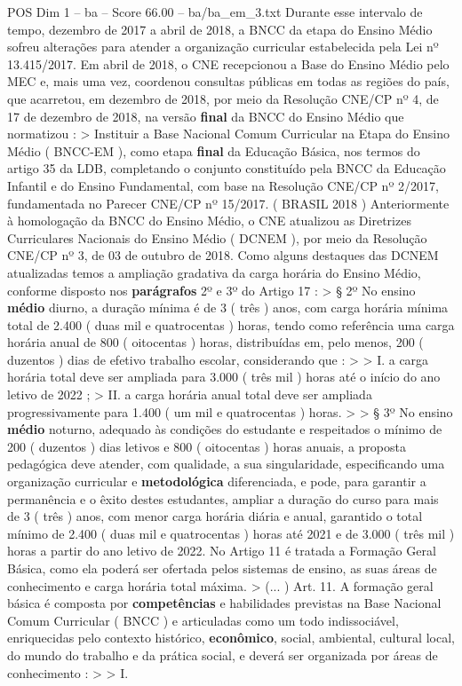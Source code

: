 \begin{textsample}{POS Dim 1 – ba – Score 66.00 – ba/ba\_em\_3.txt}
Durante esse intervalo de tempo, dezembro de 2017 a abril de 2018, a BNCC da etapa do Ensino Médio sofreu alterações para atender a organização curricular estabelecida pela Lei nº 13.415/2017.
Em abril de 2018, o CNE recepcionou a Base do Ensino Médio pelo MEC e, mais uma vez, coordenou consultas públicas em todas as regiões do país, que acarretou, em dezembro de 2018, por meio da Resolução CNE/CP nº 4, de 17 de dezembro de 2018, na versão \textbf{final} da BNCC do Ensino Médio que normatizou : > Instituir a Base Nacional Comum Curricular na Etapa do Ensino Médio ( BNCC-EM ), como etapa \textbf{final} da Educação Básica, nos termos do artigo 35 da LDB, completando o conjunto constituído pela BNCC da Educação Infantil e do Ensino Fundamental, com base na Resolução CNE/CP nº 2/2017, fundamentada no Parecer CNE/CP nº 15/2017. ( BRASIL 2018 ) Anteriormente à homologação da BNCC do Ensino Médio, o CNE atualizou as Diretrizes Curriculares Nacionais do Ensino Médio ( DCNEM ), por meio da Resolução CNE/CP nº 3, de 03 de outubro de 2018.
Como alguns destaques das DCNEM atualizadas temos a ampliação gradativa da carga horária do Ensino Médio, conforme disposto nos \textbf{parágrafos} 2º e 3º do Artigo 17 : > § 2º No ensino \textbf{médio} diurno, a duração mínima é de 3 ( três ) anos, com carga horária mínima total de 2.400 ( duas mil e quatrocentas ) horas, tendo como referência uma carga horária anual de 800 ( oitocentas ) horas, distribuídas em, pelo menos, 200 ( duzentos ) dias de efetivo trabalho escolar, considerando que : > > I. a carga horária total deve ser ampliada para 3.000 ( três mil ) horas até o início do ano letivo de 2022 ; > II. a carga horária anual total deve ser ampliada progressivamente para 1.400 ( um mil e quatrocentas ) horas. > > § 3º No ensino \textbf{médio} noturno, adequado às condições do estudante e respeitados o mínimo de 200 ( duzentos ) dias letivos e 800 ( oitocentas ) horas anuais, a proposta pedagógica deve atender, com qualidade, a sua singularidade, especificando uma organização curricular e \textbf{metodológica} diferenciada, e pode, para garantir a permanência e o êxito destes estudantes, ampliar a duração do curso para mais de 3 ( três ) anos, com menor carga horária diária e anual, garantido o total mínimo de 2.400 ( duas mil e quatrocentas ) horas até 2021 e de 3.000 ( três mil ) horas a partir do ano letivo de 2022.
No Artigo 11 é tratada a Formação Geral Básica, como ela poderá ser ofertada pelos sistemas de ensino, as suas áreas de conhecimento e carga horária total máxima. > (... ) Art. 11.
A formação geral básica é composta por \textbf{competências} e habilidades previstas na Base Nacional Comum Curricular ( BNCC ) e articuladas como um todo indissociável, enriquecidas pelo contexto histórico, \textbf{econômico}, social, ambiental, cultural local, do mundo do trabalho e da prática social, e deverá ser organizada por áreas de conhecimento : > > I.

\end{textsample}
